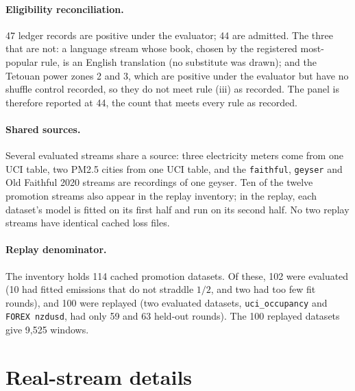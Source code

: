 \documentclass{article}
\theoremstyle{plain}
\theoremstyle{definition}
\theoremstyle{remark}
\begin{document}
\paragraph{Eligibility reconciliation.} 47 ledger records are positive under the evaluator; 44 are admitted. The three that are not: a language stream whose book, chosen by the registered most-popular rule, is an English translation (no substitute was drawn); and the Tetouan power zones 2 and 3, which are positive under the evaluator but have no shuffle control recorded, so they do not meet rule (iii) as recorded. The panel is therefore reported at 44, the count that meets every rule as recorded.

\paragraph{Shared sources.} Several evaluated streams share a source: three electricity meters come from one UCI table, two PM2.5 cities from one UCI table, and the \texttt{faithful}, \texttt{geyser} and Old Faithful 2020 streams are recordings of one geyser. Ten of the twelve promotion streams also appear in the replay inventory; in the replay, each dataset's model is fitted on its first half and run on its second half. No two replay streams have identical cached loss files.

\paragraph{Replay denominator.} The inventory holds 114 cached promotion datasets. Of these, 102 were evaluated (10 had fitted emissions that do not straddle $1/2$, and two had too few fit rounds), and 100 were replayed (two evaluated datasets, \texttt{uci\_occupancy} and \texttt{FOREX nzdusd}, had only 59 and 63 held-out rounds). The 100 replayed datasets give 9{,}525 windows.

\section{Real-stream details}
\label{app:realdetails}
\end{document}
